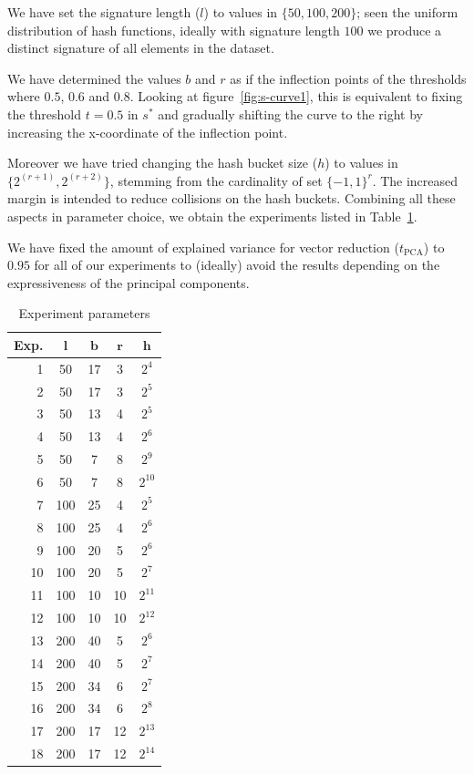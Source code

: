 We have set the signature length ($l$) to values in $\{50,100, 200\}$; seen the uniform distribution of hash functions, ideally with signature length $100$ we produce a distinct signature of all elements in the dataset. 

We have determined the values $b$ and $r$ as if the inflection points of the thresholds where $0.5$, $0.6$ and $0.8$. Looking at figure~\ref{fig:s-curve1}, this is equivalent to fixing the threshold $t=0.5$ in $s^*$ and gradually shifting the curve to the right by increasing the x-coordinate of the inflection point. 

Moreover we have tried changing the hash bucket size ($h$) to values in $\{2^{(r+1)}, 2^{(r+2)}\}$, stemming from the cardinality of set $\{-1, 1\}^r$. The increased margin is intended to reduce collisions on the hash buckets. Combining all these aspects in parameter choice, we obtain the experiments listed in Table~\ref{tab:parameters}. 

We have fixed the amount of explained variance for vector reduction ($t_\text{PCA}$) to $0.95$ for all of our experiments to (ideally) avoid the results depending on the expressiveness of the principal components. 

\begin{table}[h]
    \centering
    \caption{Experiment parameters}
    \centering
    \begin{tabular}{r|cccc}
        \toprule
        \textbf{Exp.} & $\mathbf{l}$ & $\mathbf{b}$ & $\mathbf{r}$ & $\mathbf{h}$ \\
        \midrule
        1  & 50  & 17  & 3  & $2^4$   \\
        2  & 50  & 17  & 3  & $2^5$   \\
        3  & 50  & 13  & 4  & $2^5$   \\
        4  & 50  & 13  & 4  & $2^6$   \\
        5  & 50  & 7   & 8  & $2^9$   \\
        6  & 50  & 7   & 8  & $2^{10}$ \\[4pt]
        7  & 100 & 25  & 4  & $2^5$   \\
        8  & 100 & 25  & 4  & $2^6$   \\
        9  & 100 & 20  & 5  & $2^6$   \\
        10 & 100 & 20  & 5  & $2^7$   \\
        11 & 100 & 10  & 10 & $2^{11}$ \\
        12 & 100 & 10  & 10 & $2^{12}$ \\[4pt]
        13 & 200 & 40  & 5  & $2^6$   \\
        14 & 200 & 40  & 5  & $2^7$   \\
        15 & 200 & 34  & 6  & $2^7$   \\
        16 & 200 & 34  & 6  & $2^8$   \\
        17 & 200 & 17  & 12 & $2^{13}$ \\
        18 & 200 & 17  & 12 & $2^{14}$ \\
        \bottomrule
    \end{tabular}
    \label{tab:parameters}
\end{table}

